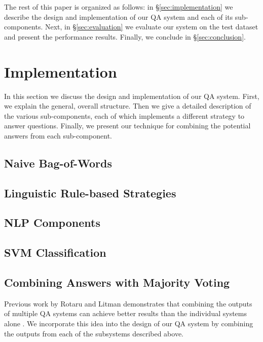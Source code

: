 \documentclass{acm_proc_article-sp}
\begin{document}
The rest of this paper is organized as follows: in
\S\ref{sec:implementation} we describe the design and implementation
of our QA system and each of its sub-components. Next, in
\S\ref{sec:evaluation} we evaluate our system on the test dataset and
present the performance results. Finally, we conclude in
\S\ref{sec:conclusion}.


\section{Implementation}

In this section we discuss the design and implementation of our QA
system. First, we explain the general, overall structure. Then we give
a detailed description of the various sub-components, each of which
implements a different strategy to answer questions. Finally, we
present our technique for combining the potential answers from each
sub-component.


\subsection{Naive Bag-of-Words}


\subsection{Linguistic Rule-based Strategies}


\subsection{NLP Components}


\subsection{SVM Classification}


\subsection{Combining Answers with Majority Voting}
Previous work by Rotaru and Litman demonstrates that combining
the outputs of multiple QA systems can achieve better results than the
individual systems alone \cite{rotaru2005}. We incorporate this idea
into the design of our QA system by combining the outputs from each of
the subsystems described above.
\end{document}
